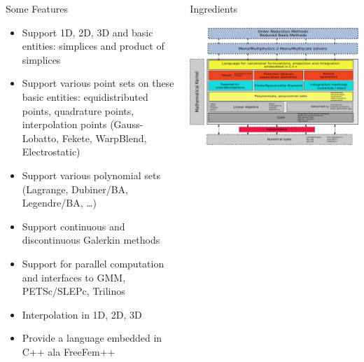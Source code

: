 \documentclass[final,utf8,,hyperref={pdfpagelabels=false}]{beamer}
\begin{document}
\begin{frame}[containsverbatim]{}
\begin{columns}[c]
    \begin{block}{Some Features}
      \begin{itemize}
      \item Support 1D, 2D, 3D and basic entities: simplices and product of simplices
      \item Support various point sets on these basic entities: equidistributed
        points, quadrature points, interpolation points (Gauss-Lobatto, Fekete,
        WarpBlend, Electrostatic)
      \item Support various polynomial sets (Lagrange, Dubiner/BA, Legendre/BA,
        \dots)
      \item Support continuous and discontinuous Galerkin methods
      \item Support for parallel computation and interfaces to GMM, PETSc/SLEPc,
        Trilinos
      \item Interpolation in 1D, 2D, 3D
      \item Provide a language embedded in C++ ala FreeFem++
      \end{itemize}
    \end{block}

    \begin{block}{Ingredients}
      \centerline{\includegraphics[width=\linewidth]{arch2.pdf}}
    \end{block}
    \vfill


\end{columns}
\end{frame}
\end{document}
